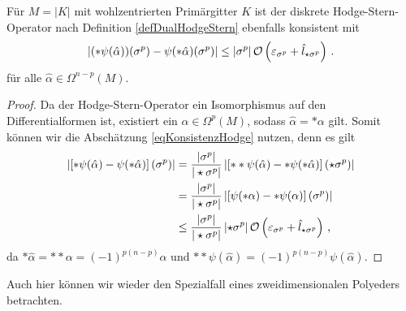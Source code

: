   \begin{folgerung}
    Für \( M=|K| \) mit wohlzentrierten Primärgitter \( K \) ist der diskrete Hodge-Stern-Operator nach Definition \ref{defDualHodgeStern} ebenfalls konsistent mit
    \begin{align}
      \label{eqKonsistenzDualHodge}
      \left| (*\psi(\hat\alpha))(\sigma^{p}) - \psi(*\hat\alpha)(\sigma^{p})\right| \le \left| \sigma^{p} \right| \mathcal{O}\left(\varepsilon_{\sigma^{p}} + \hat{l}_{\star\sigma^{p}}\right) \,\text{.}
    \end{align}
    für alle \( \hat\alpha\in\Omega^{n-p}(M) \).
  \end{folgerung}
  \begin{proof}
    Da der Hodge-Stern-Operator ein Isomorphismus auf den Differentialformen ist, existiert ein \( \alpha\in\Omega^{p}(M) \), sodass \( \hat\alpha = *\alpha \) gilt.
    Somit können wir die Abschätzung \eqref{eqKonsistenzHodge} nutzen, denn es gilt
    \begin{align}
      \left| \left[ *\psi(\hat\alpha) - \psi(*\hat\alpha) \right](\sigma^{p}) \right|
        &= \frac{|\sigma^{p}|}{|\star\sigma^{p}|} \left| \left[ **\psi(\hat\alpha) - *\psi(*\hat\alpha) \right](\star\sigma^{p}) \right| \\
        &= \frac{|\sigma^{p}|}{|\star\sigma^{p}|} \left| \left[ \psi(*\alpha) - *\psi(\alpha) \right](\sigma^{p}) \right|\\
        &\le  \frac{|\sigma^{p}|}{|\star\sigma^{p}|} \left| \star\sigma^{p} \right| \mathcal{O}\left(\varepsilon_{\sigma^{p}} + \hat{l}_{\star\sigma^{p}}\right) \,\text{,}
    \end{align}
    da \( *\hat\alpha = **\alpha = (-1)^{p(n-p)}\alpha \) und \( **\psi(\hat\alpha) =  (-1)^{p(n-p)}\psi(\hat\alpha)\).
  \end{proof}

  Auch hier können wir wieder den Spezialfall eines zweidimensionalen Polyeders betrachten.
  
